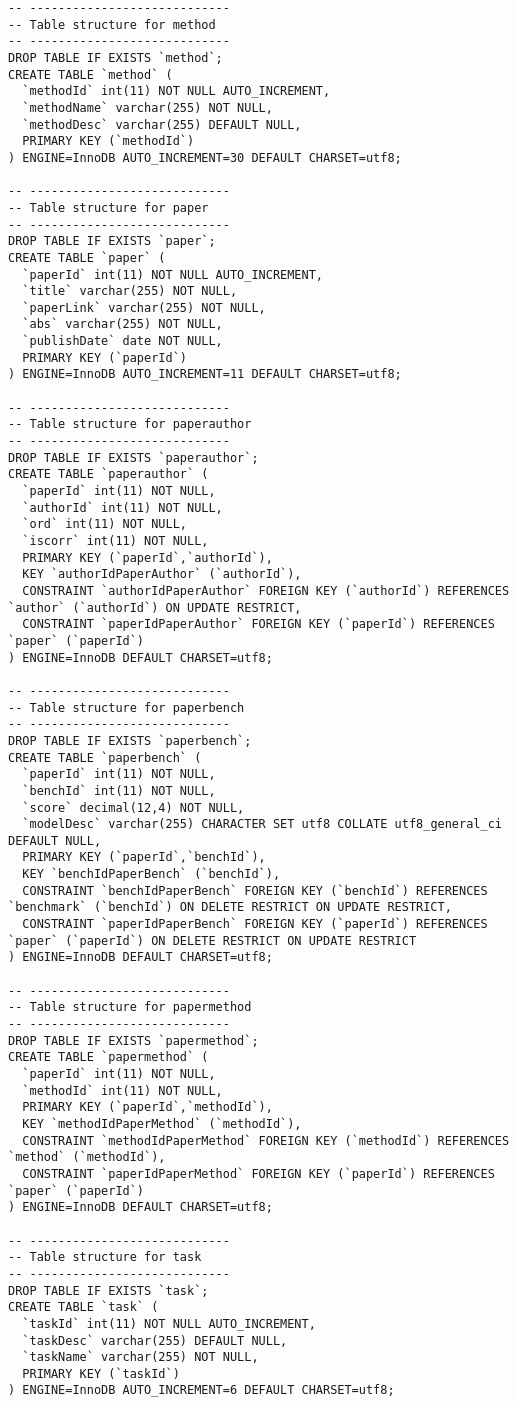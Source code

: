 \begin{verbatim}
-- ----------------------------
-- Table structure for method
-- ----------------------------
DROP TABLE IF EXISTS `method`;
CREATE TABLE `method` (
  `methodId` int(11) NOT NULL AUTO_INCREMENT,
  `methodName` varchar(255) NOT NULL,
  `methodDesc` varchar(255) DEFAULT NULL,
  PRIMARY KEY (`methodId`)
) ENGINE=InnoDB AUTO_INCREMENT=30 DEFAULT CHARSET=utf8;

-- ----------------------------
-- Table structure for paper
-- ----------------------------
DROP TABLE IF EXISTS `paper`;
CREATE TABLE `paper` (
  `paperId` int(11) NOT NULL AUTO_INCREMENT,
  `title` varchar(255) NOT NULL,
  `paperLink` varchar(255) NOT NULL,
  `abs` varchar(255) NOT NULL,
  `publishDate` date NOT NULL,
  PRIMARY KEY (`paperId`)
) ENGINE=InnoDB AUTO_INCREMENT=11 DEFAULT CHARSET=utf8;

-- ----------------------------
-- Table structure for paperauthor
-- ----------------------------
DROP TABLE IF EXISTS `paperauthor`;
CREATE TABLE `paperauthor` (
  `paperId` int(11) NOT NULL,
  `authorId` int(11) NOT NULL,
  `ord` int(11) NOT NULL,
  `iscorr` int(11) NOT NULL,
  PRIMARY KEY (`paperId`,`authorId`),
  KEY `authorIdPaperAuthor` (`authorId`),
  CONSTRAINT `authorIdPaperAuthor` FOREIGN KEY (`authorId`) REFERENCES `author` (`authorId`) ON UPDATE RESTRICT,
  CONSTRAINT `paperIdPaperAuthor` FOREIGN KEY (`paperId`) REFERENCES `paper` (`paperId`)
) ENGINE=InnoDB DEFAULT CHARSET=utf8;

-- ----------------------------
-- Table structure for paperbench
-- ----------------------------
DROP TABLE IF EXISTS `paperbench`;
CREATE TABLE `paperbench` (
  `paperId` int(11) NOT NULL,
  `benchId` int(11) NOT NULL,
  `score` decimal(12,4) NOT NULL,
  `modelDesc` varchar(255) CHARACTER SET utf8 COLLATE utf8_general_ci DEFAULT NULL,
  PRIMARY KEY (`paperId`,`benchId`),
  KEY `benchIdPaperBench` (`benchId`),
  CONSTRAINT `benchIdPaperBench` FOREIGN KEY (`benchId`) REFERENCES `benchmark` (`benchId`) ON DELETE RESTRICT ON UPDATE RESTRICT,
  CONSTRAINT `paperIdPaperBench` FOREIGN KEY (`paperId`) REFERENCES `paper` (`paperId`) ON DELETE RESTRICT ON UPDATE RESTRICT
) ENGINE=InnoDB DEFAULT CHARSET=utf8;

-- ----------------------------
-- Table structure for papermethod
-- ----------------------------
DROP TABLE IF EXISTS `papermethod`;
CREATE TABLE `papermethod` (
  `paperId` int(11) NOT NULL,
  `methodId` int(11) NOT NULL,
  PRIMARY KEY (`paperId`,`methodId`),
  KEY `methodIdPaperMethod` (`methodId`),
  CONSTRAINT `methodIdPaperMethod` FOREIGN KEY (`methodId`) REFERENCES `method` (`methodId`),
  CONSTRAINT `paperIdPaperMethod` FOREIGN KEY (`paperId`) REFERENCES `paper` (`paperId`)
) ENGINE=InnoDB DEFAULT CHARSET=utf8;

-- ----------------------------
-- Table structure for task
-- ----------------------------
DROP TABLE IF EXISTS `task`;
CREATE TABLE `task` (
  `taskId` int(11) NOT NULL AUTO_INCREMENT,
  `taskDesc` varchar(255) DEFAULT NULL,
  `taskName` varchar(255) NOT NULL,
  PRIMARY KEY (`taskId`)
) ENGINE=InnoDB AUTO_INCREMENT=6 DEFAULT CHARSET=utf8;

\end{verbatim}


